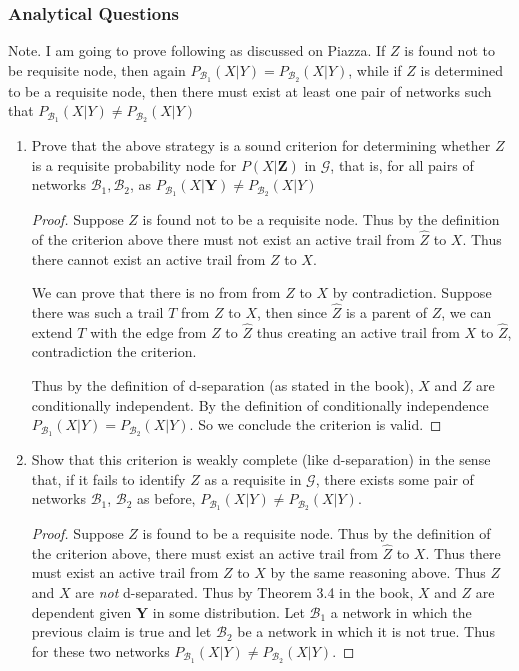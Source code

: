 \documentclass[12pt]{article}
\begin{document}
\subsubsection{Analytical Questions}
		Note. I am going to prove following as  discussed on Piazza. If $Z$ is found not to be requisite node, then again $P_{\mathcal{B}_1}(X|Y) = P_{\mathcal{B}_2}(X|Y)$, while if $Z$ is determined to be a requisite node, then there must exist at least one pair of networks such that $P_{\mathcal{B}_1}(X|Y) \not = P_{\mathcal{B}_2}(X|Y)$
\begin{enumerate}[1.]
	\item Prove that the above strategy is a sound criterion for determining whether $Z$ is a requisite probability node for $P(X|\mathbf{Z})$ in $\mathcal{G}$, that is, for all pairs of networks $\mathcal{B}_1,\mathcal{B}_2$, as $P_{\mathcal{B}_1}(X|\mathbf{Y}) \not = P_{\mathcal{B}_2}(X|Y)$ 
	\begin{proof}
	Suppose $Z$ is found not to be a requisite node. Thus by the definition of the criterion above there must not exist an active trail from $\hat{Z}$ to $X$. Thus there cannot exist an active trail from $Z$ to $X$. 
	
	We can prove that there is no from from $Z$ to $X$  by  contradiction. Suppose there was such a trail $T$ from $Z$ to $X$, then since $\hat{Z}$ is a parent of $Z$, we can extend $T$ with the edge from $Z$ to $\hat{Z}$ thus creating an active trail from $X$ to $\hat{Z}$, contradiction the criterion. 
	
	Thus by the definition of d-separation (as stated in the book), $X$ and $Z$ are conditionally independent. By the definition of conditionally independence $P_{\mathcal{B}_1}(X|Y) = P_{\mathcal{B}_2}(X|Y)$. So we conclude the criterion is valid.
	\end{proof}
	\item 
	Show that this criterion is weakly complete (like d-separation) in the sense that,
if it fails to identify $Z$ as a requisite in $\mathcal{G}$, there exists some pair of networks $\mathcal{B}_1$, $\mathcal{B}_2$ as before, $P_{\mathcal{B}_1}(X|Y) \not = P_{\mathcal{B}_2}(X|Y)$.
\begin{proof}
	Suppose $Z$ is found to be a requisite node. Thus by the definition of the criterion above, there must exist an active trail from $\hat{Z}$ to $X$. Thus there must exist an active trail from $Z$ to $X$ by the same reasoning above. Thus $Z$ and $X$ are \textit{not} d-separated. Thus by Theorem 3.4 in the book, $X$ and $Z$ are dependent given $\mathbf{Y}$ in some distribution. Let $\mathcal{B}_1$ a network in which the previous claim is true and let $\mathcal{B}_2$ be a network in which it is not true. Thus for these two networks $P_{\mathcal{B}_1}(X|Y) \not = P_{\mathcal{B}_2}(X|Y)$.
	\end{proof}
\end{enumerate}
\end{document}
